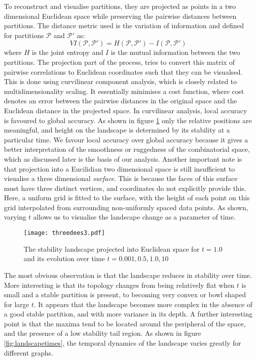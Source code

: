 To reconstruct and visualise partitions, they are projected as points in a two dimensional Euclidean space while preserving the pairwise distances between partitions.  The distance metric used is the variation of information and defined for partitions $\mathcal{P}$ and $\mathcal{P'}$ as:
\[ 
VI(\mathcal{P},\mathcal{P'})=H(\mathcal{P},\mathcal{P'})-I(\mathcal{P},\mathcal{P'})
 \]
where $H$ is the joint entropy and $I$ is the mutual information between the two partitions.  The projection part of the process, tries to convert this matrix of pairwise correlations to Euclidean coordinates such that they can be visualsed.  This is done using curvilinear component analysis, which is closely related to multidimensionality scaling.  It essentially minimises a cost function, where cost denotes an error between the pairwise distances in the original space and the Euclidean distance in the projected space.  In curvilinear analysis, local accuracy is favoured to global accuracy. As shown in figure \ref{fig:3d} only the relative positions are meaningful, and height on the landscape is determined by its stability at a particular time.  We favour local accuracy over global accuracy because it gives a better interpretation of the smoothness or ruggedness of the combinatorial space, which as discussed later is the basis of our analysis.  Another important note is that projection into a Eucilidian two dimensional space is still insufficient to visualise a three dimensional \textit{surface}.  This is because the faces of this surface must have three distinct vertices, and coordinates do not explicitly provide this.  Here, a uniform grid is fitted to the surface, with the height of each point on this grid interpolated from surrounding non-uniformly spaced data points.  As shown, varying $t$ allows us to visualise the landscape change as a parameter of time.

\begin{figure}[h]
  \centering
  \texttt{[image: threedees3.pdf]}
  \caption[The evolution of the stability landscape over time]%
  {The stability landscape projected into Euclidean space for $t=1.0$
  and its evolution over time $t=0.001, 0.5,1.0,10$}\label{fig:3d}
\end{figure}

The most obvious observation is that the landscape reduces in stability over time.  More interesting is that its topology changes from being relatively flat when $t$ is small and a stable partition is present, to becoming very convex or bowl shaped for large $t$.  It appears that the landscape becomes more complex in the absence of a good stable partition, and with more variance in its depth.  A further interesting point is that the maxima tend to be located around the peripheral of the space, and the presence of a low stability tail region.  As shown in figure \ref{fig:landscapetimes}, the temporal dynamics of the landscape varies greatly for different graphs.

